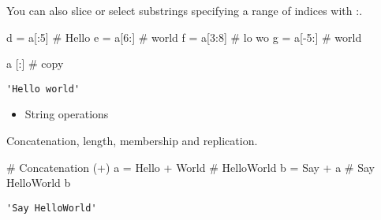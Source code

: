 \documentclass[
  letterpaper,
  DIV=11,
  numbers=noendperiod]{scrreprt}
\newenvironment{Shaded}{\begin{snugshade}}{\end{snugshade}}
\newcommand{\CommentTok}[1]{\textcolor[rgb]{0.37,0.37,0.37}{#1}}
\newcommand{\DecValTok}[1]{\textcolor[rgb]{0.68,0.00,0.00}{#1}}
\newcommand{\NormalTok}[1]{\textcolor[rgb]{0.00,0.46,0.62}{#1}}
\newcommand{\OperatorTok}[1]{\textcolor[rgb]{0.37,0.37,0.37}{#1}}
\newcommand{\NormalTok}[1]{\textcolor[rgb]{0.00,0.48,0.65}{#1}}
\newcommand{\OperatorTok}[1]{\textcolor[rgb]{0.37,0.37,0.37}{#1}}
\newcommand{\StringTok}[1]{\textcolor[rgb]{0.13,0.47,0.30}{#1}}
\providecommand{\tightlist}{%
  \setlength{\itemsep}{0pt}\setlength{\parskip}{0pt}}
\begin{document}
\begin{Shaded}
\begin{Highlighting}[]
You can also slice or select substrings specifying a range of indices
with :.

\begin{Shaded}
\begin{Highlighting}[]
\NormalTok{d }\OperatorTok{=}\NormalTok{ a[:}\DecValTok{5}\NormalTok{]     }\CommentTok{\# \textquotesingle{}Hello\textquotesingle{}}
\NormalTok{e }\OperatorTok{=}\NormalTok{ a[}\DecValTok{6}\NormalTok{:]     }\CommentTok{\# \textquotesingle{}world\textquotesingle{}}
\NormalTok{f }\OperatorTok{=}\NormalTok{ a[}\DecValTok{3}\NormalTok{:}\DecValTok{8}\NormalTok{]    }\CommentTok{\# \textquotesingle{}lo wo\textquotesingle{}}
\NormalTok{g }\OperatorTok{=}\NormalTok{ a[}\OperatorTok{{-}}\DecValTok{5}\NormalTok{:]    }\CommentTok{\# \textquotesingle{}world\textquotesingle{}}
\end{Highlighting}
\end{Shaded}

\begin{Shaded}
\begin{Highlighting}[]
\NormalTok{a [:] }\CommentTok{\# copy}
\end{Highlighting}
\end{Shaded}

\begin{verbatim}
'Hello world'
\end{verbatim}

\begin{itemize}
\tightlist
\item
  String operations
\end{itemize}

Concatenation, length, membership and replication.

\begin{Shaded}
\begin{Highlighting}[]
\CommentTok{\# Concatenation (+)}
\NormalTok{a }\OperatorTok{=} \StringTok{\textquotesingle{}Hello\textquotesingle{}} \OperatorTok{+} \StringTok{\textquotesingle{}World\textquotesingle{}}   \CommentTok{\# \textquotesingle{}HelloWorld\textquotesingle{}}
\NormalTok{b }\OperatorTok{=} \StringTok{\textquotesingle{}Say \textquotesingle{}} \OperatorTok{+}\NormalTok{ a          }\CommentTok{\# \textquotesingle{}Say HelloWorld\textquotesingle{}}
\NormalTok{b}
\end{Highlighting}
\end{Shaded}

\begin{verbatim}
'Say HelloWorld'
\end{verbatim}


\end{Highlighting}
\end{Shaded}
\end{document}
